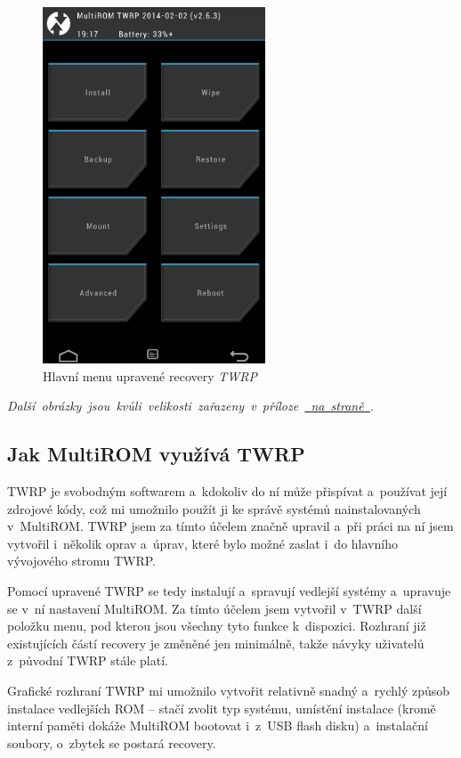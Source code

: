 \documentclass[12pt, a4paper, oneside]{article}
\newcommand{\It}{\textit}  %
\newcommand*{\attref}[1]{\hyperref[{#1}]{\uv{\nameref*{#1}} na straně \pageref{#1}}}
\begin{document}
\begin{figure}[H]
\begin{center}
 \includegraphics[width=250px]{img/recovery.png}
\caption{Hlavní menu upravené recovery \It{TWRP}}
\end{center}
\end{figure}
\vspace{-20pt}
\noindent \mbox{\It{Další obrázky jsou kvůli velikosti zařazeny v~příloze \attref{obrazky}.}}

\subsection{Jak MultiROM využívá TWRP}
TWRP je svobodným softwarem a~kdokoliv do ní může přispívat a~používat její zdrojové kódy, což mi umožnilo použít ji ke správě systémů nainstalovaných v~MultiROM. TWRP jsem za tímto účelem značně upravil a~při práci na ní jsem vytvořil i~několik oprav a~úprav, které bylo možné zaslat i~do hlavního vývojového stromu TWRP.

Pomocí upravené TWRP se tedy instalují a~spravují vedlejší systémy a~upravuje se v~ní nastavení MultiROM. Za tímto účelem jsem vytvořil v~TWRP další položku menu, pod kterou jsou všechny tyto funkce k~dispozici. Rozhraní již existujících částí recovery je změněné jen minimálně, takže návyky uživatelů z~původní TWRP stále platí.

Grafické rozhraní TWRP mi umožnilo vytvořit relativně snadný a~rychlý způsob instalace vedlejších ROM -- stačí zvolit typ systému, umístění instalace (kromě interní paměti dokáže MultiROM bootovat i~z~USB flash disku) a~instalační soubory, o~zbytek se postará recovery.
\end{document}

